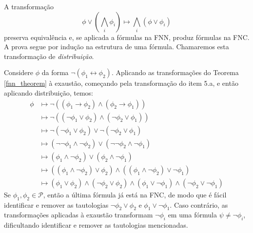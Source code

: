 \begin{theorem}
    A transformação $$\phi \vee \left( \bigwedge_i \phi_i \right) \longmapsto \bigwedge_i \left( \phi \vee \phi_i \right)$$ preserva equivalência e, se aplicada a fórmulas na FNN, produz fórmulas na FNC. A prova segue por indução na estrutura de uma fórmula. Chamaremos esta transformação de \emph{distribuição}.
\end{theorem}

\begin{example}
    Considere $\phi$ da forma $\neg(\phi_1 \leftrightarrow \phi_2)$. Aplicando as transformações do Teorema \ref{fnn_theorem} à exaustão, começando pela transformação do item 5.a, e então aplicando distribuição, temos:
    \begin{equation*}
        \begin{split}
            \phi & \longmapsto \neg((\phi_1 \rightarrow \phi_2) \wedge (\phi_2 \rightarrow \phi_1)) \\
                 & \longmapsto \neg((\neg \phi_1 \vee \phi_2) \wedge (\neg \phi_2 \vee \phi_1)) \\
                 & \longmapsto \neg(\neg \phi_1 \vee \phi_2) \vee \neg(\neg \phi_2 \vee \phi_1) \\
                 & \longmapsto (\neg \neg \phi_1 \wedge \neg \phi_2) \vee (\neg \neg \phi_2 \wedge \neg \phi_1) \\
                 & \longmapsto (\phi_1 \wedge \neg \phi_2) \vee (\phi_2 \wedge \neg \phi_1) \\
                 & \longmapsto ((\phi_1 \wedge \neg \phi_2) \vee \phi_2) \wedge ((\phi_1 \wedge \neg \phi_2) \vee \neg \phi_1) \\
                 & \longmapsto (\phi_1 \vee \phi_2) \wedge (\neg \phi_2 \vee \phi_2) \wedge (\phi_1 \vee \neg \phi_1) \wedge (\neg \phi_2 \vee \neg \phi_1)
        \end{split}
    \end{equation*}
    Se $\phi_1,\phi_2 \in \mathcal{P}$, então a última fórmula já está na FNC, de modo que é fácil identificar e remover as tautologias $\neg \phi_2 \vee \phi_2$ e $\phi_1 \vee \neg \phi_1$. Caso contrário, as transformações aplicadas à exaustão transformam $\neg \phi_i$ em uma fórmula $\psi \neq \neg \phi_i$, dificultando identificar e remover as tautologias mencionadas.
    

\end{example}
